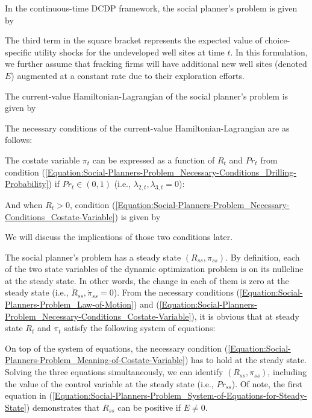 In the continuous-time DCDP framework, the social planner's problem is given by

The third term in the square bracket represents the expected value of choice-specific utility shocks for the undeveloped well sites at time $t$. In this formulation, we further assume that fracking firms will have additional new well sites (denoted $E$) augmented at a constant rate due to their exploration efforts. 

The current-value Hamiltonian-Lagrangian of the social planner's problem is given by


The necessary conditions of the current-value Hamiltonian-Lagrangian are as follows:


The costate variable $\pi_{t}$ can be expressed as a function of $R_{t}$ and $Pr_{t}$ from condition (\ref{Equation:Social-Planners-Problem_Necessary-Conditions_Drilling-Probability}) if $Pr_{t} \in (0,1)$ (i.e., $\lambda_{2,t}, \lambda_{3,t} = 0$):

And when $R_{t} > 0$, condition (\ref{Equation:Social-Planners-Problem_Necessary-Conditions_Costate-Variable}) is given by

We will discuss the implications of those two conditions later. 


The social planner's problem has a steady state $(R_{ss}, \pi_{ss})$. By definition, each of the two state variables of the dynamic optimization problem is on its nullcline at the steady state. In other words, the change in each of them is zero at the steady state (i.e., $\dot{R}_{ss}, \dot{\pi}_{ss} = 0$). From the necessary conditions (\ref{Equation:Social-Planners-Problem_Law-of-Motion}) and (\ref{Equation:Social-Planners-Problem_Necessary-Conditions_Costate-Variable}), it is obvious that at steady state $R_{t}$ and $\pi_{t}$ satisfy the following system of equations:

On top of the system of equations, the necessary condition (\ref{Equation:Social-Planners-Problem_Meaning-of-Costate-Variable}) has to hold at the steady state. Solving the three equations simultaneously, we can identify $(R_{ss}, \pi_{ss})$, including the value of the control variable at the steady state (i.e., $Pr_{ss}$). Of note, the first equation in (\ref{Equation:Social-Planners-Problem_System-of-Equations-for-Steady-State}) demonstrates that $R_{ss}$ can be positive if $E \neq 0$.

